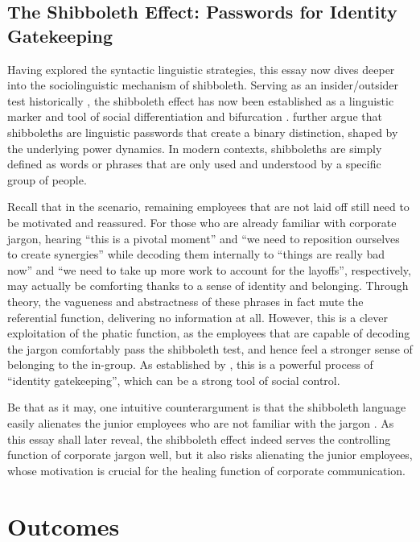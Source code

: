 \documentclass[a4paper,12pt]{article}
\begin{document}
\subsection{The Shibboleth Effect: Passwords for Identity Gatekeeping}

Having explored the syntactic linguistic strategies, this essay now dives deeper into the sociolinguistic mechanism of shibboleth.
Serving as an insider/outsider test historically \parencite{McNamara2005}, the shibboleth effect has now been established as a linguistic marker and tool of social differentiation and bifurcation \parencite{Busch2021}.
\textcite{Busch2021} further argue that shibboleths are linguistic passwords that create a binary distinction, shaped by the underlying power dynamics.
In modern contexts, shibboleths are simply defined as words or phrases that are only used and understood by a specific group of people.

Recall that in the scenario, remaining employees that are not laid off still need to be motivated and reassured.
For those who are already familiar with corporate jargon, hearing ``this is a pivotal moment'' and ``we need to reposition ourselves to create synergies'' while decoding them internally to ``things are really bad now'' and ``we need to take up more work to account for the layoffs'', respectively, may actually be comforting thanks to a sense of identity and belonging.
Through  theory, the vagueness and abstractness of these phrases in fact mute the referential function, delivering no information at all.
However, this is a clever exploitation of the phatic function, as the employees that are capable of decoding the jargon comfortably pass the shibboleth test, and hence feel a stronger sense of belonging to the in-group.
As established by \textcite{VanDeMieroop2023}, this is a powerful process of ``identity gatekeeping'', which can be a strong tool of social control.

Be that as it may, one intuitive counterargument is that the shibboleth language easily alienates the junior employees who are not familiar with the jargon \parencites{Busch2021}{McNamara2005}.
As this essay shall later reveal, the shibboleth effect indeed serves the controlling function of corporate jargon well, but it also risks alienating the junior employees, whose motivation is crucial for the healing function of corporate communication.

\section{Outcomes}
\end{document}
